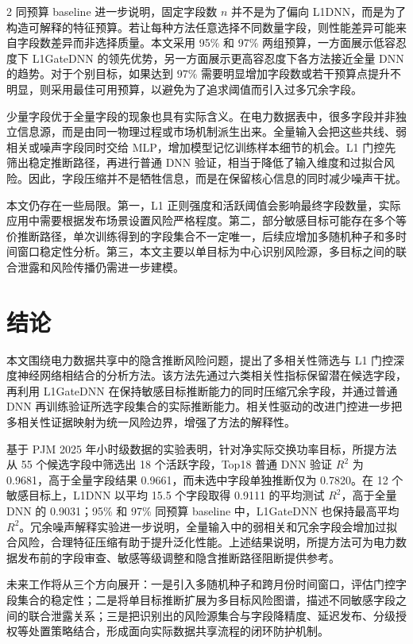 \documentclass[UTF8,zihao=5,twoside]{ctexart}
\numberwithin{equation}{section}
\begin{document}
\begin{multicols}{2}
同预算 baseline 进一步说明，固定字段数 $n$ 并不是为了偏向 L1DNN，而是为了构造可解释的特征预算。若让每种方法任意选择不同数量字段，则性能差异可能来自字段数差异而非选择质量。本文采用 95\% 和 97\% 两组预算，一方面展示低容忍度下 L1GateDNN 的领先优势，另一方面展示更高容忍度下各方法接近全量 DNN 的趋势。对于个别目标，如果达到 97\% 需要明显增加字段数或若干预算点提升不明显，则采用最佳可用预算，以避免为了追求阈值而引入过多冗余字段。

少量字段优于全量字段的现象也具有实际含义。在电力数据表中，很多字段并非独立信息源，而是由同一物理过程或市场机制派生出来。全量输入会把这些共线、弱相关或噪声字段同时交给 MLP，增加模型记忆训练样本细节的机会。L1 门控先筛出稳定推断路径，再进行普通 DNN 验证，相当于降低了输入维度和过拟合风险。因此，字段压缩并不是牺牲信息，而是在保留核心信息的同时减少噪声干扰。

本文仍存在一些局限。第一，L1 正则强度和活跃阈值会影响最终字段数量，实际应用中需要根据发布场景设置风险严格程度。第二，部分敏感目标可能存在多个等价推断路径，单次训练得到的字段集合不一定唯一，后续应增加多随机种子和多时间窗口稳定性分析。第三，本文主要以单目标为中心识别风险源，多目标之间的联合泄露和风险传播仍需进一步建模。

\section{结论}
本文围绕电力数据共享中的隐含推断风险问题，提出了多相关性筛选与 L1 门控深度神经网络相结合的分析方法。该方法先通过六类相关性指标保留潜在候选字段，再利用 L1GateDNN 在保持敏感目标推断能力的同时压缩冗余字段，并通过普通 DNN 再训练验证所选字段集合的实际推断能力。相关性驱动的改进门控进一步把多相关性证据映射为统一风险边界，增强了方法的解释性。

基于 PJM 2025 年小时级数据的实验表明，针对净实际交换功率目标，所提方法从 55 个候选字段中筛选出 18 个活跃字段，Top18 普通 DNN 验证 $R^2$ 为 0.9681，高于全量字段结果 0.9661，而未选中字段单独推断仅为 0.7820。在 12 个敏感目标上，L1DNN 以平均 15.5 个字段取得 0.9111 的平均测试 $R^2$，高于全量 DNN 的 0.9031；95\% 和 97\% 同预算 baseline 中，L1GateDNN 也保持最高平均 $R^2$。冗余噪声解释实验进一步说明，全量输入中的弱相关和冗余字段会增加过拟合风险，合理特征压缩有助于提升泛化性能。上述结果说明，所提方法可为电力数据发布前的字段审查、敏感等级调整和隐含推断路径阻断提供参考。

未来工作将从三个方向展开：一是引入多随机种子和跨月份时间窗口，评估门控字段集合的稳定性；二是将单目标推断扩展为多目标风险图谱，描述不同敏感字段之间的联合泄露关系；三是把识别出的风险源集合与字段降精度、延迟发布、分级授权等处置策略结合，形成面向实际数据共享流程的闭环防护机制。


\end{multicols}
\end{document}
